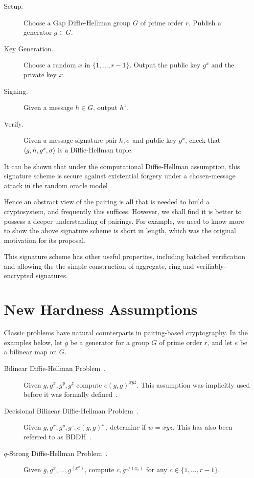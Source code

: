 \begin{description}
\item[Setup.]
Choose a Gap Diffie-Hellman group $G$ of prime order $r$.
Publish a generator $g \in G$.

\item[Key Generation.]
Choose a random $x$ in $\{1,...,r-1\}$. Output
the public key $g^x$ and the private key $x$.

\item[Signing.]
Given a message $h \in G$, output $h^x$.

\item[Verify.]
Given a message-signature pair $h, \sigma$ and public key $g^x$,
check that $\langle{ g, h, g^x, \sigma}\rangle$ is a Diffie-Hellman tuple.
\end{description}

It can be shown that under the computational Diffie-Hellman assumption, this
signature scheme is secure against existential forgery under a chosen-message
attack in the random oracle model \cite{bls}.

Hence an abstract view of the pairing is all that is needed to build a
cryptosystem, and frequently this suffices. However, we shall find it is better
to possess a deeper understanding of pairings. For example, we need to know
more to show the above signature scheme is short in length, which was the
original motivation for its proposal.

This signature scheme has other useful properties, including batched
verification and allowing the the simple construction of aggregate, ring and
verifiably-encrypted signatures\cite{bgls}.

\section{New Hardness Assumptions}

Classic problems have natural counterparts in pairing-based
cryptography. In the examples below, let $g$ be a generator
for a group $G$ of prime order $r$, and let $e$ be a bilinear map
on $G$.

\begin{description}
\item [Bilinear Diffie-Hellman Problem~\cite{bf}.]
Given $g,g^x,g^y,g^z$ compute $e(g,g)^{xyz}$. This assumption
was implicitly used before it was formally defined~\cite{sok, j}.
\item [Decisional Bilinear Diffie-Hellman Problem~\cite{bbibe}.]
Given $g,g^x,g^y,g^z,e(g,g)^w$, determine if $w = x y z$.
This has also been referred to as BDDH~\cite{bf}.
\item [$q$-Strong Diffie-Hellman Problem~\cite{bbshort}.]
Given $g,g^x,...,g^{(x^q)}$, compute $c, g^{1/(x_c)}$
for any $c\in\{1,...,r-1\}$.
\end{description}

